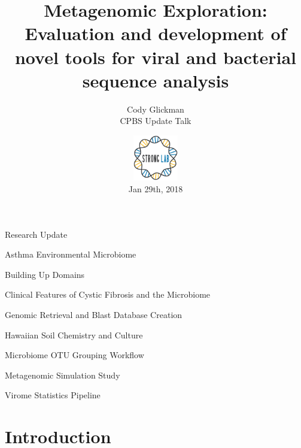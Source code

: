 \documentclass[11pt]{beamer}
\author{Cody Glickman \\ CPBS Update Talk}
\title{Metagenomic Exploration: \\ Evaluation and development of novel tools for viral and bacterial sequence analysis}
\date{ \includegraphics[height=2cm, width=2cm]{lablogo.png} \\ Jan 29th, 2018}
\begin{document}
	\maketitle
	\begin{frame}{Research Update}
	\begin{block}{Asthma Environmental Microbiome}
	\end{block}
	\vspace{-0.5cm}
	\begin{block}{\alert{Building Up Domains}}
	\end{block}
	\vspace{-0.5cm}
	\begin{block}{Clinical Features of Cystic Fibrosis and the Microbiome}
	\end{block}
	\vspace{-0.5cm}
	\begin{block}{\alert{Genomic Retrieval and Blast Database Creation}}
	\end{block}
	\vspace{-0.5cm}
	\begin{block}{Hawaiian Soil Chemistry and Culture}
	\end{block}
	\vspace{-0.5cm}
	\begin{block}{Microbiome OTU Grouping Workflow}
	\end{block}
	\vspace{-0.5cm}
	\begin{block}{\alert{Metagenomic Simulation Study}}
	\end{block}
	\vspace{-0.5cm}
	\begin{block}{Virome Statistics Pipeline}
	\end{block}
	\end{frame}
	
	
\section{Introduction}
\subsection{}
\end{document}
